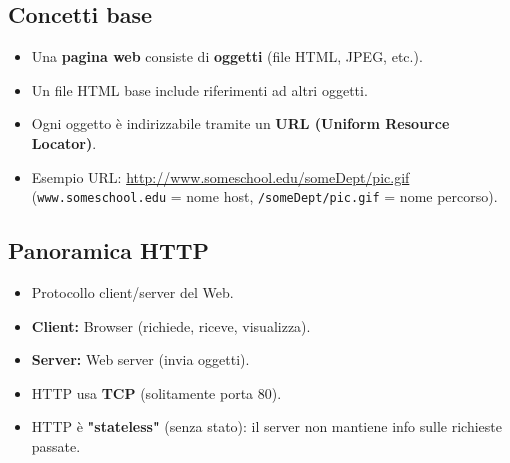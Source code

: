\subsection{Concetti base}
\begin{itemize}
    \item Una \textbf{pagina web} consiste di \textbf{oggetti} (file HTML, JPEG, etc.).
    \item Un file HTML base include riferimenti ad altri oggetti.
    \item Ogni oggetto è indirizzabile tramite un \textbf{URL (Uniform Resource Locator)}.
    \item Esempio URL: \url{http://www.someschool.edu/someDept/pic.gif}
    (\texttt{www.someschool.edu} = nome host, \texttt{/someDept/pic.gif} = nome percorso).
\end{itemize}

\subsection{Panoramica HTTP}
\begin{itemize}
    \item Protocollo client/server del Web.
    \item \textbf{Client:} Browser (richiede, riceve, visualizza).
    \item \textbf{Server:} Web server (invia oggetti).
    \item HTTP usa \textbf{TCP} (solitamente porta 80).
    \item HTTP è \textbf{"stateless"} (senza stato): il server non mantiene info sulle richieste passate.
\end{itemize}

